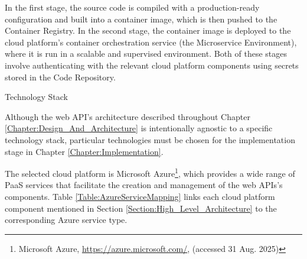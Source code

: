 \documentclass[12pt,reqno, oneside]{amsbook}
\makeatletter
\def\section{\@startsection{section}{1}%
      \z@{.5\linespacing\@plus.7\linespacing}{.25\linespacing}%
      {\normalfont\bfseries\flushleft}}
\theoremstyle{definition}
\theoremstyle{definition}
\numberwithin{section}{chapter}
\numberwithin{table}{chapter}
\numberwithin{figure}{chapter}
\makeatother
\begin{document}
In the first stage, the source code is compiled with a production-ready configuration and built into a container image, which is then pushed to the Container Registry. In the second stage, the container image is deployed to the cloud platform's container orchestration service (the Microservice Environment), where it is run in a scalable and supervised environment. Both of these stages involve authenticating with the relevant cloud platform components using secrets stored in the Code Repository.

\pagebreak

\section{Technology Stack}
\label{Section:Technology_Stack}

Although the web \ac{API}'s architecture described throughout Chapter \ref{Chapter:Design_And_Architecture} is intentionally agnostic to a specific technology stack, particular technologies must be chosen for the implementation stage in Chapter \ref{Chapter:Implementation}.

The selected cloud platform is Microsoft Azure\footnote{Microsoft Azure, \url{https://azure.microsoft.com/}, (accessed 31 Aug. 2025)}, which provides a wide range of \ac{PaaS} services that facilitate the creation and management of the web \acp{API}'s components. Table \ref{Table:AzureServiceMapping} links each cloud platform component mentioned in Section \ref{Section:High_Level_Architecture} to the corresponding Azure service type.
\end{document}
